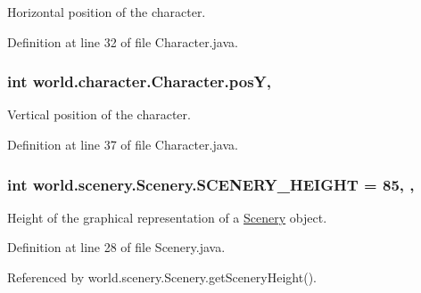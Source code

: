 Horizontal position of the character. 



Definition at line 32 of file Character.\-java.

\hypertarget{a00005_a1e81a73a02b73e6f1608ba3c1b6d83ef}{
\subsubsection[{pos\-Y}]{\setlength{\rightskip}{0pt plus 5cm}int world.\-character.\-Character.\-pos\-Y\hspace{0.3cm}{\ttfamily [protected]}, {\ttfamily [inherited]}}}\label{a00005_a1e81a73a02b73e6f1608ba3c1b6d83ef}


Vertical position of the character. 



Definition at line 37 of file Character.\-java.

\hypertarget{a00024_a106e53ae6e1647395740237ccce7f363}{
\subsubsection[{S\-C\-E\-N\-E\-R\-Y\-\_\-\-H\-E\-I\-G\-H\-T}]{\setlength{\rightskip}{0pt plus 5cm}int world.\-scenery.\-Scenery.\-S\-C\-E\-N\-E\-R\-Y\-\_\-\-H\-E\-I\-G\-H\-T = 85\hspace{0.3cm}{\ttfamily [static]}, {\ttfamily [protected]}, {\ttfamily [inherited]}}}\label{a00024_a106e53ae6e1647395740237ccce7f363}


Height of the graphical representation of a \hyperlink{a00024}{Scenery} object. 



Definition at line 28 of file Scenery.\-java.



Referenced by world.\-scenery.\-Scenery.\-get\-Scenery\-Height().

